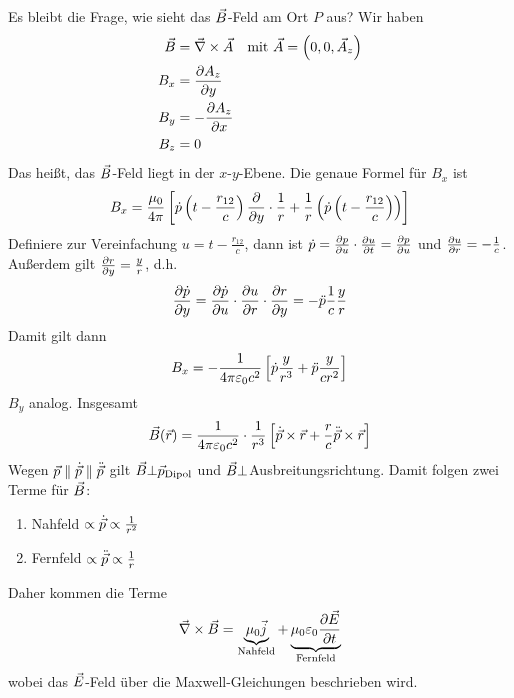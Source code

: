 Es bleibt die Frage, wie sieht das $\vecB$-Feld am Ort $P$ aus?
Wir haben
\begin{align*}
  \vecB &= \vecna\times\vecA 
  &\text{mit } \vecA = \left( 0,0,\vecA_z \right)\\
  B_x &= \dif[A_z]{y} \\
  B_y &= -\dif[A_z]{x}\\
  B_z &= 0
\end{align*}
Das heißt, das $\vecB$-Feld liegt in der $x$-$y$-Ebene.
Die genaue Formel für $B_x$ ist
\begin{gather*}
  B_x = \frac{\muo}{4\pi}\left[
    \dot{p}\left(t-\frac{r_{12}}{c}\right)\dif{y}\cdot\frac{1}{r}
      + \frac{1}{r}\left(\dot{p}\left(t-\frac{r_{12}}{c}\right)\right)
    \right]
\end{gather*}
Definiere zur Vereinfachung $u=t-\frac{r_{12}}{c}$, dann ist
$\dot{p} = \dif[p]{u}\cdot\dif[u]{t} = \dif[p]{u}$
und $\dif[u]{r} = -\frac{1}{c}$.
Außerdem gilt $\dif[r]{y}=\frac{y}{r}$, d.h.
\begin{gather*}
  \dif[\dot{p}]{y} = \dif[\dot{p}]{u}\cdot\dif[u]{r}\cdot\dif[r]{y}
  = -\ddot{p}\frac{1}{c}\frac{y}{r}
\end{gather*}
Damit gilt dann
\begin{gather*}
  B_x = -\frac{1}{4\pi\epso c^2}
  \left[ \dot{p}\frac{y}{r^3} 
    + \ddot{p} \frac{y}{cr^2} \right]
\end{gather*}
$B_y$ analog. Insgesamt
\begin{gather*}
  \vecB(\vecr) = \frac{1}{4\pi\epso c^2}\cdot
  \frac{1}{r^3}
  \left[ 
    \dot{\vecp}\times\vecr 
    + \frac{r}{c}\ddot{\vecp}\times\vecr
  \right]
\end{gather*}
Wegen $\vecp\parallel\dot{\vecp}\parallel\ddot{\vecp}$
gilt $\vecB \bot \vecp_{\text{Dipol}}$ und
$\vecB \bot$Ausbreitungsrichtung.
Damit folgen zwei Terme für $\vecB$:
\begin{enumerate}
\item Nahfeld $\propto \dot\vecp \propto \frac{1}{r^2}$
\item Fernfeld $\propto \ddot\vecp \propto \frac{1}{r}$
\end{enumerate}
Daher kommen die Terme
\begin{gather*}
  \vecna \times \vecB 
  = \underbrace{\mu_0\vecj}_{\text{Nahfeld}}
  + \underbrace{\muo\epso \dif[\vecE]{t}}_{\text{Fernfeld}}
\end{gather*}
wobei das $\vecE$-Feld über die Maxwell-Gleichungen beschrieben wird.


